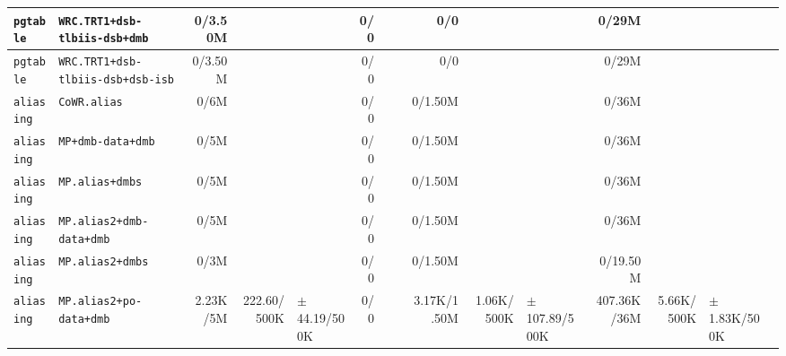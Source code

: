 \begin{tabular}{l l  | r r l | r r l | r r l | r r l l}
        \verb|pgtable| &                         \verb|WRC.TRT1+dsb-tlbiis-dsb+dmb| &        0/3.50M &                       &                   &            0/0 &                       &  &            0/0 &                       &                   &          0/29M &                       &                   & \\ \hline 
        \verb|pgtable| &                     \verb|WRC.TRT1+dsb-tlbiis-dsb+dsb-isb| &        0/3.50M &                       &                   &            0/0 &                       &  &            0/0 &                       &                   &          0/29M &                       &                   & \\ \hline 
       \verb|aliasing| &                                          \verb|CoWR.alias| &           0/6M &                       &                   &            0/0 &                       &  &        0/1.50M &                       &                   &          0/36M &                       &                   & \\ \hline 
       \verb|aliasing| &                                     \verb|MP+dmb-data+dmb| &           0/5M &                       &                   &            0/0 &                       &  &        0/1.50M &                       &                   &          0/36M &                       &                   & \\ \hline 
       \verb|aliasing| &                                       \verb|MP.alias+dmbs| &           0/5M &                       &                   &            0/0 &                       &  &        0/1.50M &                       &                   &          0/36M &                       &                   & \\ \hline 
       \verb|aliasing| &                              \verb|MP.alias2+dmb-data+dmb| &           0/5M &                       &                   &            0/0 &                       &  &        0/1.50M &                       &                   &          0/36M &                       &                   & \\ \hline 
       \verb|aliasing| &                                      \verb|MP.alias2+dmbs| &           0/3M &                       &                   &            0/0 &                       &  &        0/1.50M &                       &                   &       0/19.50M &                       &                   & \\ \hline 
       \verb|aliasing| &                               \verb|MP.alias2+po-data+dmb| &       2.23K/5M &           222.60/500K &  $\pm$ 44.19/500K &            0/0 &                       &  &    3.17K/1.50M &            1.06K/500K & $\pm$ 107.89/500K &    407.36K/36M &            5.66K/500K &  $\pm$ 1.83K/500K & \\ \hline 

\end{tabular}

